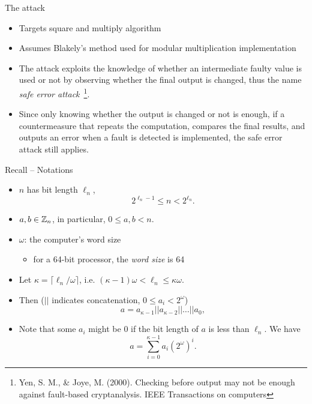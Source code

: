 \begin{frame}{The attack}
    \begin{itemize}
        \item Targets square and multiply algorithm
        \item Assumes Blakely's method used for modular multiplication implementation
        \item The attack exploits the knowledge of whether an intermediate faulty value is used or not by observing whether the final output is changed, thus the name \textit{safe error attack}~\footnote{Yen, S. M., \& Joye, M. (2000). Checking before output may not be enough against fault-based cryptanalysis. IEEE Transactions on computers}.
       \item Since only knowing whether the output is changed or not is enough, if a countermeasure that repeats the computation, compares the final results, and outputs an error when a fault is detected is implemented, the safe error attack still applies.
    \end{itemize}
\end{frame}

\begin{frame}{Recall -- Notations}
    \begin{itemize}
        \item $n$ has bit length $\ell_n$, 
\begin{equation*}
    2^{\ell_n-1}\leq n<2^{\ell_n}.
\end{equation*}
        \item $a, b\in{\mathbb Z}_n$, in particular, $0\leq a,b<n$.
       \item $\omega$: the computer's word size
       \begin{itemize}
           \item for a 64-bit processor, the \textit{word size} is 64
       \end{itemize}
       \item Let $\kappa=\lceil \ell_n/\omega\rceil$, i.e. $(\kappa-1)\omega<\ell_n\leq \kappa\omega$.
      \item Then ($||$ indicates concatenation, $0\leq a_i< 2^{\omega}$)
\[
a=a_{\kappa-1}||a_{\kappa-2}||\dots||a_0,
\]
      \item Note that some $a_i$ might be $0$ if the bit length of $a$ is less than $\ell_n$. We have
\begin{equation*}
a=\sum_{i=0}^{\kappa-1}a_i(2^\omega)^i.
\end{equation*}
    \end{itemize}
\end{frame}

